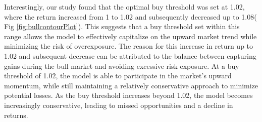 \documentclass{article}
\begin{document}
Interestingly, our study found that the optimal buy threshold was set at 1.02, where the return increased from 1 to 1.02 and subsequently decreased up to 1.08( Fig \ref{fig:bullcontourPlot}). This suggests that a buy threshold set within this range allows the model to effectively capitalize on the upward market trend while minimizing the risk of overexposure. The reason for this increase in return up to 1.02 and subsequent decrease can be attributed to the balance between capturing gains during the bull market and avoiding excessive risk exposure. At a buy threshold of 1.02, the model is able to participate in the market's upward momentum, while still maintaining a relatively conservative approach to minimize potential losses. As the buy threshold increases beyond 1.02, the model becomes increasingly conservative, leading to missed opportunities and a decline in returns.
\end{document}
